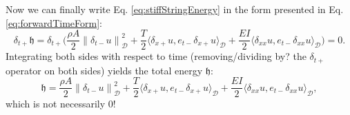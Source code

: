 \documentclass{article}
\begin{document}
Now we can finally write Eq. \eqref{eq:stiffStringEnergy} in the form presented in Eq. \eqref{eq:forwardTimeForm}:
\begin{equation}
    \delta_{t+}\mathfrak{h} = \delta_{t+}\Bigg(\frac{\rho A}{2}\left\lVert\delta_{t-}u\right\rVert_\mathcal{D}^2 + \frac{T}{2}\langle\delta_{x+}u, e_{t-}\delta_{x+}u\rangle_\mathcal{D} +\frac{EI}{2}\langle\delta_{xx}u,e_{t-}\delta_{xx}u\rangle_\mathcal{D}\Bigg) = 0.
\end{equation}
Integrating both sides with respect to time (removing/dividing by? the $\delta_{t+}$ operator on both sides) yields the total energy $\mathfrak{h}$:
\begin{equation}\label{eq:totEnergyString}
    \mathfrak{h} = \frac{\rho A}{2}\left\lVert\delta_{t-}u\right\rVert_\mathcal{D}^2 + \frac{T}{2}\langle\delta_{x+}u, e_{t-}\delta_{x+}u\rangle_\mathcal{D} +\frac{EI}{2}\langle\delta_{xx}u,e_{t-}\delta_{xx}u\rangle_\mathcal{D},
\end{equation}
which is not necessarily 0! 
\end{document}
